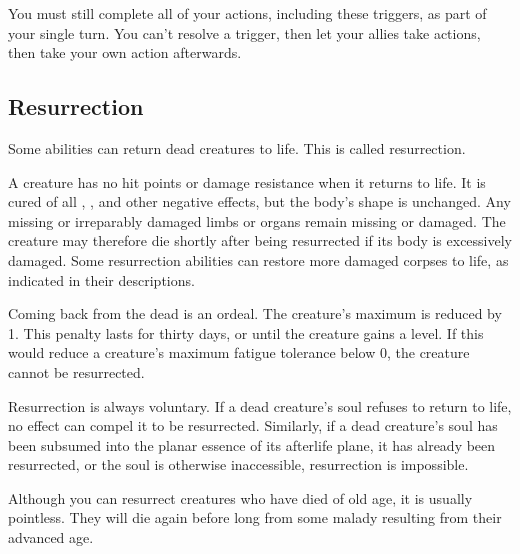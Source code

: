         You must still complete all of your actions, including these triggers, as part of your single turn.
        You can't resolve a trigger, then let your allies take actions, then take your own action afterwards.

    \subsection{Resurrection}\label{Resurrection}
        Some abilities can return dead creatures to life.
        This is called resurrection.

        A creature has no hit points or damage resistance when it returns to life.
        It is cured of all , , and other negative effects, but the body's shape is unchanged.
        Any missing or irreparably damaged limbs or organs remain missing or damaged.
        The creature may therefore die shortly after being resurrected if its body is excessively damaged.
        Some resurrection abilities can restore more damaged corpses to life, as indicated in their descriptions.

        Coming back from the dead is an ordeal.
        The creature's maximum  is reduced by 1.
        This penalty lasts for thirty days, or until the creature gains a level.
        If this would reduce a creature's maximum fatigue tolerance below 0, the creature cannot be resurrected.

        Resurrection is always voluntary.
        If a dead creature's soul refuses to return to life, no effect can compel it to be resurrected.
        Similarly, if a dead creature's soul has been subsumed into the planar essence of its afterlife plane, it has already been resurrected, or the soul is otherwise inaccessible, resurrection is impossible.

        Although you can resurrect creatures who have died of old age, it is usually pointless.
        They will die again before long from some malady resulting from their advanced age.

